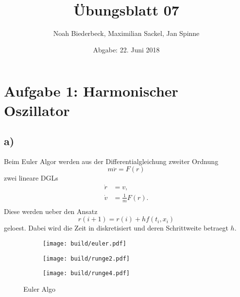 \documentclass{scrartcl}
\title{Übungsblatt 07}
\author{%
		Noah Biederbeck, Maximilian Sackel, Jan Spinne
}
\date{Abgabe: 22. Juni 2018}
\begin{document}
\maketitle
\section*{Aufgabe 1: Harmonischer Oszillator}
\subsection*{a)}
Beim Euler Algor werden aus der Differentialgleichung zweiter Ordnung
\begin{equation}
		m \ddot{r} = F(r)
\end{equation}
zwei lineare DGLs
\begin{eqnarray}
		\dot{r} &= v,  \\
		\dot{v} &= \frac{1}{m} F(r). \\ 
\end{eqnarray}
Diese werden ueber den Ansatz 
\begin{equation}
		r(i+1) = r(i) + h f(t_i, x_i)
\end{equation}
geloest. Dabei wird die Zeit in diskretisiert und deren Schrittweite 
betraegt $h$.
\begin{figure}[ht]
		\centering
\begin{subfigure}[b]{0.3\textwidth}
\begin{center}
		\texttt{[image: build/euler.pdf]}
\end{center}
\caption{}
\label{fig:}
\end{subfigure}
\begin{subfigure}[b]{0.3\textwidth}
\begin{center}
		\texttt{[image: build/runge2.pdf]}
\end{center}
\caption{}
\label{fig:}
\end{subfigure}
\begin{subfigure}[b]{0.3\textwidth}
\begin{center}
		\texttt{[image: build/runge4.pdf]}
\end{center}
\caption{}
\label{fig:}
\end{subfigure}
		\caption{Euler Algo}
		\label{fig:euler}
\end{figure}
\end{document}
